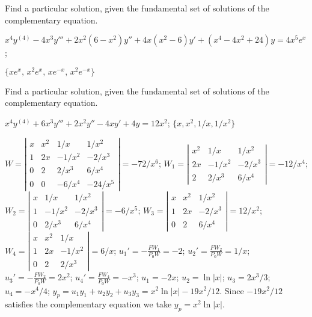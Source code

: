 \documentclass{ximera}
\begin{document}
\begin{problem}\label{exer:9.4.17}
Find a particular
solution, given the fundamental set of solutions of the complementary equation.

$x^4y^{(4)}-4x^3y'''+2x^2(6-x^2)y''+4x(x^2-6)y'+(x^4-4x^2+24)y=4x^5e^x$;
\quad

 $\{xe^x,\,x^2e^x,\,xe^{-x},\,x^2e^{-x}\}$
\end{problem}

\begin{problem}\label{exer:9.4.18}
Find a particular
solution, given the fundamental set of solutions of the complementary equation.

$x^4y^{(4)}+6x^3y'''+2x^2y''-4xy'+4y=12x^2$;   \quad
$\{x,x^2,1/x,1/x^2\}$

\begin{solution}
$W=\left|\begin{array}{cccc}
x&x^2&1/x&1/x^2\\
1&2x&-1/x^2&-2/x^3\\
0&2&2/x^3&6/x^4\\0&0&-6/x^4&-24/x^5
\end{array}\right|=-72/x^6$;
$W_1=\left|\begin{array}{cccc}
x^2&1/x&1/x^2\\2x&-1/x^2&-2/x^3
\\2&2/x^3&6/x^4\end
{array}\right|=-12/x^4$;
$W_2=\left|\begin{array}{cccc}
x&1/x&1/x^2\\1&-1/x^2&-2/x^3\\
0&2/x^3&6/x^4\end{array}\right|=-6/x^5$;
$W_3=\left|\begin{array}{cccc}
x&x^2&1/x^2\\1&2x&-2/x^3\\
0&2&6/x^4\end{array}\right|=12/x^2$;
$W_4=\left|\begin{array}{cccc}
x&x^2&1/x\\1&2x&-1/x^2\\
0&2&2/x^3\end{array}\right|=6/x$;
$u_1'=-\frac{FW_1}{P_0W}=-2$;
$u_2'=\frac{FW_2}{P_0W}=1/x$;
$u_3'=-\frac{FW_2}{P_0W}=2x^2$;
$u_4'=\frac{FW_4}{P_0W}=-x^3$;
$u_1=-2x$;
$u_2=\ln|x|$;
$u_3=2x^3/3$;
$u_4=-x^4/4$;
$y_p=u_1y_1+u_2y_2+u_3y_3= x^2\ln|x|-19x^2/12$.
Since $-19x^2/12$ satisfies the complementary equation we take
$y_p= x^2\ln|x|$.
\end{solution}
\end{problem}
\end{document}
